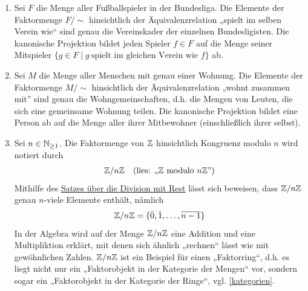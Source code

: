 \begin{bsp} \label{bsp:faktormenge} \quad
    \begin{enumerate}
        \item Sei $F$ die Menge aller Fußballspieler in der Bundesliga. Die Elemente der Faktormenge $F/{\sim}$ hinsichtlich der Äquivalenzrelation „spielt im selben Verein wie“ sind genau die Vereinskader der einzelnen Bundesligisten. Die kanonische Projektion bildet jeden Spieler $f\in F$ auf die Menge seiner Mitspieler $\{g\in F\mid g\ \text{spielt im gleichen Verein wie $f$}\}$ ab.
        \item Sei $M$ die Menge aller Menschen mit genau einer Wohnung. Die Elemente der Faktormenge $M/{\sim}$ hinsichtlich der Äquivalenzrelation „wohnt zusammen mit” sind genau die Wohngemeinschaften, d.h. die Mengen von Leuten, die sich eine gemeinsame Wohnung teilen. Die kanonische Projektion bildet eine Person ab auf die Menge aller ihrer Mitbewohner (einschließlich ihrer selbst).
        \item Sei $n\in \mathbb N_{\ge 1}$. Die Faktormenge von $\mathbb Z$ hinsichtlich Kongruenz modulo $n$ wird notiert durch
        \begin{align*}
            \mathbb Z/n\mathbb Z && (\text{lies: „$\mathbb Z$ modulo $n\mathbb Z$”})
        \end{align*}
        Mithilfe des \href{https://de.wikipedia.org/wiki/Division_mit_Rest}{Satzes über die Division mit Rest} lässt sich beweisen, dass $\mathbb Z/n\mathbb Z$ genau $n$-viele Elemente enthält, nämlich
        \[ \mathbb Z/n\mathbb Z = \{\bar 0,\bar 1,\dots , \overline{n-1} \} \]
        In der Algebra wird auf der Menge $\mathbb Z/n\mathbb Z$ eine Addition und eine Multipliktion erklärt, mit denen sich ähnlich „rechnen“ lässt wie mit gewöhnlichen Zahlen. $\mathbb Z/n\mathbb Z$ ist ein Beispiel für einen „Faktorring“, d.h. es liegt nicht nur ein „Faktorobjekt in der Kategorie der Mengen“ vor, sondern sogar ein „Faktorobjekt in der Kategorie der Ringe“, vgl. \cref{kategorien}.
    \end{enumerate}
\end{bsp}


